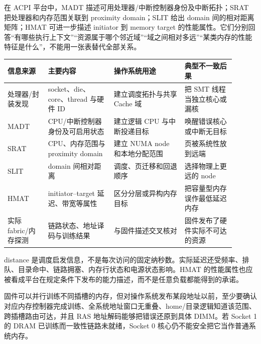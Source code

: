 
在 ACPI 平台中，MADT 描述可用处理器/中断控制器身份及中断拓扑；SRAT 把处理器和内存范围关联到 proximity domain；SLIT 给出 domain 间的相对距离矩阵；HMAT 可进一步描述 initiator 到 memory target 的性能属性。它们分别回答“有哪些执行上下文”“资源属于哪个邻近域”“域之间相对多远”“某类内存的性能特征是什么”，不能用一张表替代全部关系。\cite{uefi-spec}

\begin{longtable}{L{0.16\linewidth}L{0.26\linewidth}L{0.28\linewidth}L{0.20\linewidth}}
\toprule
信息来源 & 主要内容 & 操作系统用途 & 典型不一致后果 \\
\midrule
处理器/封装发现 & socket、die、core、thread 与硬件 ID & 建立调度拓扑与共享 Cache 域 & 把 SMT 线程当独立核心或漏核 \\\tablerowrule
MADT & CPU/中断控制器身份及可启用状态 & 建立逻辑 CPU 与中断投递目标 & 唤醒错误核心或中断无目标 \\\tablerowrule
SRAT & CPU、内存范围与 proximity domain & 建立 NUMA node 和本地分配范围 & 页被系统性放到远端 \\\tablerowrule
SLIT & domain 间相对距离 & 调度、页迁移和回退顺序 & 选择物理上更远的 node \\\tablerowrule
HMAT & initiator--target 延迟、带宽等属性 & 区分分层或异构内存目标 & 把容量型内存误作最低延迟内存 \\\tablerowrule
实际 fabric/内存探测 & 链路状态、地址译码与训练结果 & 与固件描述交叉核对 & 固件发布了硬件实际不可达的资源 \\
\bottomrule
\end{longtable}

distance 是调度启发信息，不是每次访问的固定纳秒数。实际延迟还受频率、排队、目录命中、链路拥塞、内存行状态和电源状态影响。HMAT 的性能属性也应被看成平台在规定条件下发布的能力描述，而不是任意负载都能得到的承诺。


固件可以并行训练不同插槽的内存，但对操作系统发布某段地址以前，至少要确认对应内存控制器完成训练、全系统地址窗口无重叠、home/目录逻辑知道该范围、跨插槽路由可达，并且 RAS 地址解码能够把错误还原到具体 DIMM。若 Socket 1 的 DRAM 已训练而一致性链路未就绪，Socket 0 核心仍不能安全把它当作普通系统内存。

